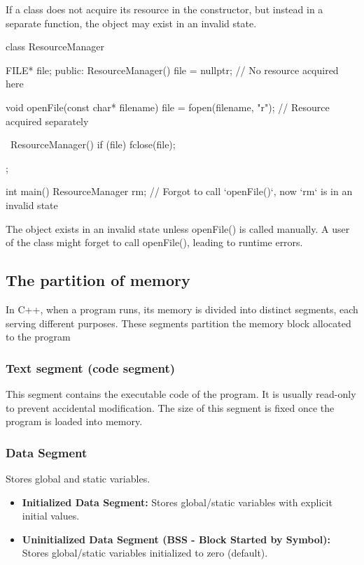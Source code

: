 \documentclass{report}
\begin{document}
\bigbreak \noindent 
If a class does not acquire its resource in the constructor, but instead in a separate function, the object may exist in an invalid state.
\bigbreak \noindent 
\begin{cppcode}
class ResourceManager {
    FILE* file;
public:
    ResourceManager() { file = nullptr; } // No resource acquired here 

    void openFile(const char* filename) {
        file = fopen(filename, "r");  // Resource acquired separately 
    }

    ~ResourceManager() {
        if (file) fclose(file);
    }
};

int main() {
    ResourceManager rm;
    // Forgot to call `openFile()`, now `rm` is in an invalid state 
}
\end{cppcode}
\bigbreak \noindent 
The object exists in an invalid state unless openFile() is called manually. A user of the class might forget to call openFile(), leading to runtime errors.

\bigbreak \noindent 
\subsection{The partition of memory}
\bigbreak \noindent 
In C++, when a program runs, its memory is divided into distinct segments, each serving different purposes. These segments partition the memory block allocated to the program
\bigbreak \noindent 
\subsubsection{Text segment (code segment)}
\bigbreak \noindent 
This segment contains the executable code of the program. It is usually read-only to prevent accidental modification. The size of this segment is fixed once the program is loaded into memory.

\bigbreak \noindent 
\subsubsection{Data Segment}
\bigbreak \noindent 
Stores global and static variables.
\begin{itemize}
    \item \textbf{Initialized Data Segment:} Stores global/static variables with explicit initial values.
    \item \textbf{Uninitialized Data Segment (BSS - Block Started by Symbol):} Stores global/static variables initialized to zero (default).
\end{itemize}
\end{document}
